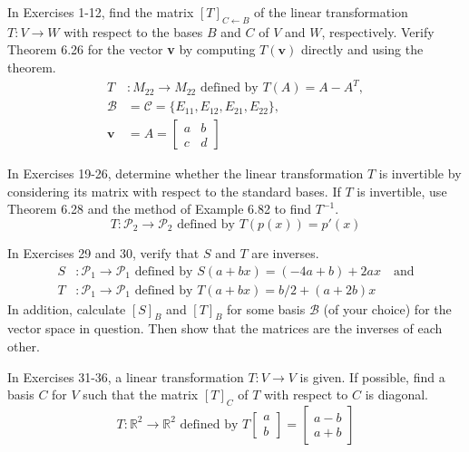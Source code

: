 \documentclass[12pt,letterpaper]{hmcpset}
\newcommand{\RR}{\mathbb{R}}
\newcommand{\m}[1]{\begin{bmatrix} #1 \end{bmatrix}}
\begin{document}
\begin{problem}[6.6.12]
    In Exercises 1-12, find the matrix $[T]_{C\leftarrow B}$ of the
    linear transformation $T:V\to W$ with respect to the bases $B$ and
    $C$ of $V$ and $W$, respectively. Verify Theorem 6.26 for the
    vector \textbf{v} by computing $T(\textbf{v})$ directly and using
    the theorem.
    \begin{align*}
        T&:M_{22}\to M_{22}\text{ defined by }T(A)=A-A^T,\\\mathcal{B}&=
        \mathcal{C}=\{E_{11},E_{12},E_{21},E_{22}\},\\\textbf{v}&=A=\m{a&b\\c&d}
    \end{align*}
\end{problem}
\begin{solution}
    \vfill
\end{solution}
\newpage

\begin{problem}[6.6.22]
    In Exercises 19-26, determine whether the linear transformation
    $T$ is invertible by considering its matrix with respect to the
    standard bases. If $T$ is invertible, use Theorem 6.28 and the
    method of Example 6.82 to find $T^{-1}$.
    \[
        T:\mathscr{P}_2\to\mathscr{P}_2\text{ defined by }T(p(x))=p'(x)
    \]
\end{problem}
\begin{solution}
    \vfill
\end{solution}
\newpage

\begin{problem}[6.4.30]
    In Exercises 29 and 30, verify that $S$ and $T$ are inverses.
    \begin{align*}
        S&:\mathscr{P}_1\to\mathscr{P}_1\text{ defined by }S(a+bx)=(-4a+b)+2ax
        \quad\text{and}\\
        T&:\mathscr{P}_1\to\mathscr{P}_1\text{ defined by }T(a+bx)=b/2+(a+2b)x
    \end{align*}
    In addition, calculate $[S]_B$ and $[T]_B$ for some basis $\mathcal{B}$
    (of your choice) for the vector space in question. Then show that the
    matrices are the inverses of each other.
\end{problem}
\begin{solution}
    \vfill
\end{solution}
\newpage

\begin{problem}[6.6.32]
    In Exercises 31-36, a linear transformation $T:V\to V$ is
    given. If possible, find a basis $C$ for $V$ such that the matrix
    $[T]_C$ of $T$ with respect to $C$ is diagonal.
    \[
        T:\RR^2\to\RR^2\text{ defined by }T\m{a\\b}=\m{a-b\\a+b}
    \]
\end{problem}
\begin{solution}
    \vfill
\end{solution}
\end{document}
